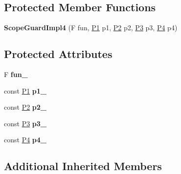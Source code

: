 \subsection*{Protected Member Functions}
\begin{DoxyCompactItemize}
\item 
\hypertarget{classLoki_1_1ScopeGuardImpl4_a777e03ce45ae91c5eadc92434a089af8}{}{\bfseries Scope\+Guard\+Impl4} (F fun, \hyperlink{structP1}{P1} p1, \hyperlink{structP2}{P2} p2, \hyperlink{structP3}{P3} p3, \hyperlink{structP4}{P4} p4)\label{classLoki_1_1ScopeGuardImpl4_a777e03ce45ae91c5eadc92434a089af8}

\end{DoxyCompactItemize}
\subsection*{Protected Attributes}
\begin{DoxyCompactItemize}
\item 
\hypertarget{classLoki_1_1ScopeGuardImpl4_ad0fa336b16052c6be8b496c196880873}{}F {\bfseries fun\+\_\+}\label{classLoki_1_1ScopeGuardImpl4_ad0fa336b16052c6be8b496c196880873}

\item 
\hypertarget{classLoki_1_1ScopeGuardImpl4_af60ea107a23d06f06bb942c4c4b65245}{}const \hyperlink{structP1}{P1} {\bfseries p1\+\_\+}\label{classLoki_1_1ScopeGuardImpl4_af60ea107a23d06f06bb942c4c4b65245}

\item 
\hypertarget{classLoki_1_1ScopeGuardImpl4_a61f5a723f06eba5fde2b6f2167d5d9f0}{}const \hyperlink{structP2}{P2} {\bfseries p2\+\_\+}\label{classLoki_1_1ScopeGuardImpl4_a61f5a723f06eba5fde2b6f2167d5d9f0}

\item 
\hypertarget{classLoki_1_1ScopeGuardImpl4_a0a1929766e7b1b6167005299bb9e24b1}{}const \hyperlink{structP3}{P3} {\bfseries p3\+\_\+}\label{classLoki_1_1ScopeGuardImpl4_a0a1929766e7b1b6167005299bb9e24b1}

\item 
\hypertarget{classLoki_1_1ScopeGuardImpl4_a8d7496e59f9fb9e2b70d655420fe5192}{}const \hyperlink{structP4}{P4} {\bfseries p4\+\_\+}\label{classLoki_1_1ScopeGuardImpl4_a8d7496e59f9fb9e2b70d655420fe5192}

\end{DoxyCompactItemize}
\subsection*{Additional Inherited Members}


